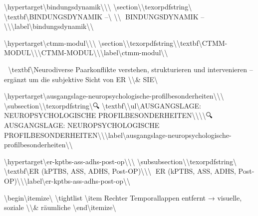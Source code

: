 \textbackslash{}hypertarget\textbackslash{}{bindungsdynamik\textbackslash{}}\textbackslash{}{\textbackslash{}%
\textbackslash{}section\textbackslash{}{\textbackslash{}texorpdfstring\textbackslash{}{🧾 \textbackslash{}textbf\textbackslash{}{BINDUNGSDYNAMIK --\textbackslash{}} \textbackslash{}}\textbackslash{}{🧾 BINDUNGSDYNAMIK -- \textbackslash{}}\textbackslash{}}\textbackslash{}label\textbackslash{}{bindungsdynamik\textbackslash{}}\textbackslash{}}

\textbackslash{}hypertarget\textbackslash{}{ctmm-modul\textbackslash{}}\textbackslash{}{\textbackslash{}%
\textbackslash{}section\textbackslash{}{\textbackslash{}texorpdfstring\textbackslash{}{\textbackslash{}textbf\textbackslash{}{CTMM-MODUL\textbackslash{}}\textbackslash{}}\textbackslash{}{CTMM-MODUL\textbackslash{}}\textbackslash{}}\textbackslash{}label\textbackslash{}{ctmm-modul\textbackslash{}}\textbackslash{}}

🧩 \textbackslash{}textbf\textbackslash{}{Neurodiverse Paarkonflikte verstehen, strukturieren und intervenieren -- ergänzt um die subjektive Sicht von ER \textbackslash{}\textbackslash{}& SIE\textbackslash{}}

\textbackslash{}hypertarget\textbackslash{}{ausgangslage-neuropsychologische-profilbesonderheiten\textbackslash{}}\textbackslash{}{\textbackslash{}%
\textbackslash{}subsection\textbackslash{}{\textbackslash{}texorpdfstring\textbackslash{}{🔍 \textbackslash{}textbf\textbackslash{}{\textbackslash{}ul\textbackslash{}{AUSGANGSLAGE: NEUROPSYCHOLOGISCHE PROFILBESONDERHEITEN\textbackslash{}}\textbackslash{}}\textbackslash{}}\textbackslash{}{🔍 AUSGANGSLAGE: NEUROPSYCHOLOGISCHE PROFILBESONDERHEITEN\textbackslash{}}\textbackslash{}}\textbackslash{}label\textbackslash{}{ausgangslage-neuropsychologische-profilbesonderheiten\textbackslash{}}\textbackslash{}}

\textbackslash{}hypertarget\textbackslash{}{er-kptbs-ass-adhs-post-op\textbackslash{}}\textbackslash{}{\textbackslash{}%
\textbackslash{}subsubsection\textbackslash{}{\textbackslash{}texorpdfstring\textbackslash{}{🔵 \textbackslash{}textbf\textbackslash{}{ER (kPTBS, ASS, ADHS, Post-OP)\textbackslash{}}\textbackslash{}}\textbackslash{}{🔵 ER (kPTBS, ASS, ADHS, Post-OP)\textbackslash{}}\textbackslash{}}\textbackslash{}label\textbackslash{}{er-kptbs-ass-adhs-post-op\textbackslash{}}\textbackslash{}}

\textbackslash{}begin\textbackslash{}{itemize\textbackslash{}}
\textbackslash{}tightlist
\textbackslash{}item
  Rechter Temporallappen entfernt → visuelle, soziale \textbackslash{}\textbackslash{}& räumliche
\textbackslash{}end\textbackslash{}{itemize\textbackslash{}}

